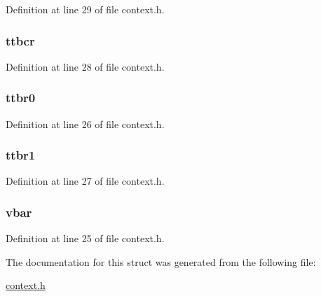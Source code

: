 \-Definition at line 29 of file context.\-h.

\hypertarget{structarch__regs__cop_a18368f32ecf9fa858d6caedd845ec701}{
\subsubsection[{ttbcr}]{ {\bf ttbcr}}}\label{structarch__regs__cop_a18368f32ecf9fa858d6caedd845ec701}


\-Definition at line 28 of file context.\-h.

\hypertarget{structarch__regs__cop_a63fedd79936a58893e5d3a188565c194}{
\subsubsection[{ttbr0}]{ {\bf ttbr0}}}\label{structarch__regs__cop_a63fedd79936a58893e5d3a188565c194}


\-Definition at line 26 of file context.\-h.

\hypertarget{structarch__regs__cop_a1dca0b48c512d7e2301433e859d4007d}{
\subsubsection[{ttbr1}]{ {\bf ttbr1}}}\label{structarch__regs__cop_a1dca0b48c512d7e2301433e859d4007d}


\-Definition at line 27 of file context.\-h.

\hypertarget{structarch__regs__cop_a335ee10c53de8aea54ce9cd9bc56d4e0}{
\subsubsection[{vbar}]{ {\bf vbar}}}\label{structarch__regs__cop_a335ee10c53de8aea54ce9cd9bc56d4e0}


\-Definition at line 25 of file context.\-h.



\-The documentation for this struct was generated from the following file\-:\begin{DoxyCompactItemize}
\item 
\hyperlink{context_8h}{context.\-h}\end{DoxyCompactItemize}
